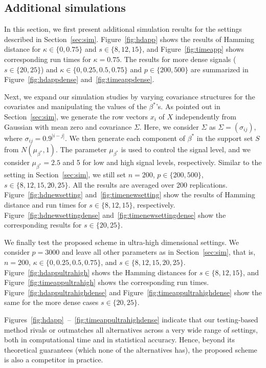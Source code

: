 \documentclass{elsarticle}
\newcommand{\revision}[1]{#1}
\begin{document}
\subsection{Additional simulations}\label{sec:appsim}


In this section, we first present additional simulation results for the settings described in Section~\ref{sec:sim}. Figure~\ref{fig:hdapp} shows the results of Hamming distance for $\kappa\in\{0,0.75\}$ and $s\in\{8,12,15\}$, and Figure~\ref{fig:timeapp} shows corresponding run times for $\kappa=0.75$. The results for more dense signals ($s\in\{20,25\}$) and $\kappa\in\{0,0.25,0.5,0.75\}$ and $p\in\{200,500\}$ are summarized in Figure~\ref{fig:hdappdense} and~\ref{fig:timeappdense}.

Next, we  expand our simulation studies by varying covariance structures for the covariates and manipulating the values of the $\beta^*$'s. As pointed out in Section~\ref{sec:sim}, we generate the row vectors $x_i$ of $X$ independently from Gaussian with mean zero and covariance $\Sigma$. Here, we consider $\Sigma$ as $\Sigma=(\sigma_{ij})$, where $\sigma_{ij}=0.9^{|i-j|}$. We then generate each component of $\beta^*$ in the support set $S$ from $N(\mu_{\beta^*},1)$. The parameter $\mu_{\beta^*}$ is used to control the signal level, and we consider $\mu_{\beta^*}=2.5$ and 5 for low and high signal levels, respectively. Similar to the setting in Section~\ref{sec:sim}, we still set $n=200$, $p\in\{200,500\}$, $s\in\{8,12,15,20,25\}$. All the
results are averaged over 200 replications. Figure~\ref{fig:hdnewsetting} and~\ref{fig:timenewsetting} show the results of Hamming distance and run times for $s\in\{8,12,15\}$, respectively. Figure~\ref{fig:hdnewsettingdense} and~\ref{fig:timenewsettingdense} show the corresponding results for $s\in\{20,25\}$.

\revision{
We finally test the proposed scheme in ultra-high dimensional settings.
We consider $p=3000$ and leave all other parameters as in Section~\ref{sec:sim}, that is, $n=200$, $\kappa\in\{0, 0.25, 0.5, 0.75\}$, and $s\in\{8, 12, 15, 20, 25\}$.
Figure~\ref{fig:hdappultrahigh} shows the Hamming distances for $s\in\{8, 12, 15\}$, and Figure~\ref{fig:timeappultrahigh} shows the corresponding run times.
Figure~\ref{fig:hdappultrahighdense} and Figure~\ref{fig:timeappultrahighdense} show the same for the more dense cases $s\in\{20, 25\}$.
}

\revision{
Figures~\ref{fig:hdapp}~--~\ref{fig:timeappultrahighdense} indicate that our testing-based method rivals or outmatches all alternatives across a very wide range of settings, both in computational time and in statistical accuracy.
Hence, beyond its theoretical guarantees (which none of the alternatives has), the proposed scheme is also a competitor in practice.
}
\end{document}
